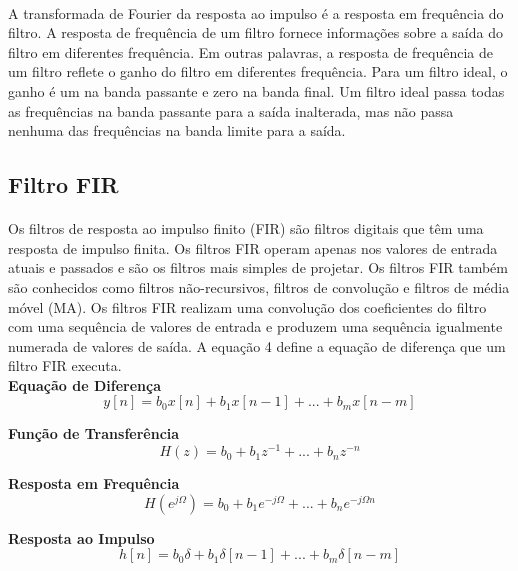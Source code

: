 \documentclass[12pt,fleqn]{article}
\begin{document}
\paragraph{} A transformada de Fourier da resposta ao impulso é a resposta em frequência do filtro. A resposta de frequência de um filtro fornece informações sobre a saída do filtro em diferentes frequência. Em outras palavras, a resposta de frequência de um filtro reflete o ganho do filtro em diferentes frequência. Para um filtro ideal, o ganho é um na banda passante e zero na banda final. Um filtro ideal passa todas as frequências na banda passante para a saída inalterada, mas não passa nenhuma das frequências na banda limite para a saída.

\subsection{Filtro FIR}
\paragraph{} Os filtros de resposta ao impulso finito (FIR) são filtros digitais que têm uma resposta de impulso finita. Os filtros FIR operam apenas nos valores de entrada atuais e passados e são os filtros mais simples de projetar. Os filtros FIR também são conhecidos como filtros não-recursivos, filtros de convolução e filtros de média móvel (MA). Os filtros FIR realizam uma convolução dos coeficientes do filtro com uma sequência de valores de entrada e produzem uma sequência igualmente numerada de valores de saída. A equação 4 define a equação de diferença que um filtro FIR executa.\\

\textbf{Equação de Diferença}
\begin{equation}
y[n] = b_0x[n] + b_1x[n-1] + ... + b_mx[n-m]
\end{equation}

\textbf{Função de Transferência}
\begin{equation}
H(z) = b_0 + b_1z^{-1} + ... + b_nz^{-n}
\end{equation}

\textbf{Resposta em Frequência}
\begin{equation}
H(e^{j\Omega}) = b_0 + b_1e^{-j\Omega} + ... + b_ne^{-j\Omega n}
\end{equation}

\textbf{Resposta ao Impulso}
\begin{equation}
h[n] = b_0\delta + b_1\delta[n-1] + ... + b_m\delta[n-m]
\end{equation}
\end{document}
